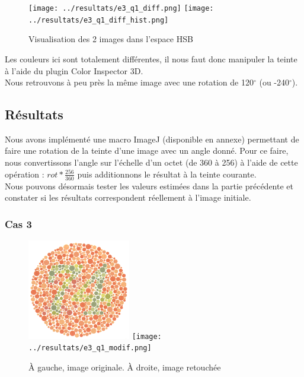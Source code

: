 \documentclass[a4paper]{article}
\begin{document}
\begin{figure}[H]
\begin{center}
\texttt{[image: ../resultats/e3\_q1\_diff.png]}
\texttt{[image: ../resultats/e3\_q1\_diff\_hist.png]}
\end{center}
\caption{Visualisation des 2 images dans l'espace HSB}
\end{figure}

Les couleurs ici sont totalement différentes, il nous faut donc manipuler la teinte à l'aide du plugin Color Inspector 3D.\\
Nous retrouvons à peu près la même image avec une rotation de 120${^\circ}$ (ou -240${^\circ}$).

\subsection{Résultats}
Nous avons implémenté une macro ImageJ (disponible en annexe) permettant de faire une rotation de la teinte d'une image avec un angle donné. Pour ce faire, nous convertissons l'angle sur l'échelle d'un octet (de 360 à 256) à l'aide de cette opération : $rot * \frac{256}{360}$ puis additionnons le résultat à la teinte courante.\\

Nous pouvons désormais tester les valeurs estimées dans la partie précédente et constater si les résultats correspondent réellement à l'image initiale.

\subsubsection{Cas 3}

\begin{figure}[H]
\begin{center}
\includegraphics[width=170px]{../base/cas_3_dalton74.png}
\texttt{[image: ../resultats/e3\_q1\_modif.png]}
\end{center}
\caption{À gauche, image originale. À droite, image retouchée}
\end{figure}
\end{document}
